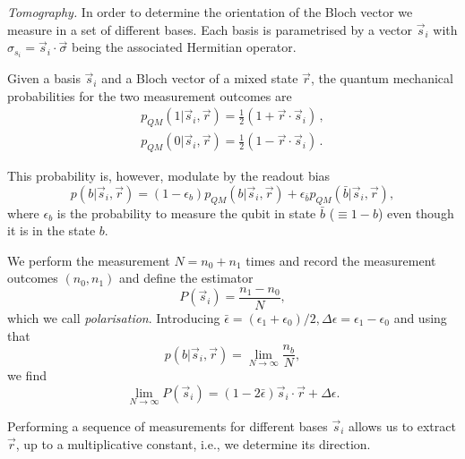 \documentclass[a4paper,twocolumn,11pt, accepted=2024-06-14]{quantumarticle}
\begin{document}
\emph{Tomography.} In order to determine the orientation of the Bloch vector we measure in a set of different bases. Each basis is parametrised by a vector $\vec{s}_i$ with $\sigma_{s_i} = \vec{s}_i \cdot \vec{\sigma}$ being the associated Hermitian operator.

Given a basis $\vec{s}_i$ and a Bloch vector of a mixed state $\vec{r}$, the quantum mechanical probabilities for the two measurement outcomes are
\begin{equation}\label{eqn:probs}
\begin{split}
p_{QM}(1|\vec{s}_i, \vec{r}) = \frac{1}{2}(1+\vec{r}\cdot\vec{s}_i)\,,\\
p_{QM}(0|\vec{s}_i, \vec{r}) = \frac{1}{2}(1-\vec{r}\cdot\vec{s}_i)\,.
\end{split}
\end{equation}

This probability is, however, modulate by the readout bias
\begin{equation}
    p(b|\vec{s}_i, \vec{r}) = (1-\epsilon_b)p_{QM}(b|\vec{s}_i, \vec{r}) + \epsilon_{\bar{b}} p_{QM}(\bar{b}|\vec{s}_i, \vec{r}), \label{eqn:marg}
\end{equation}
where $\epsilon_b$ is the probability to measure the qubit in state $\bar{b}$ ($\equiv 1-b$) even though it is in the state $b$.



We perform the measurement $N=n_0 + n_1$ times and record the measurement outcomes $(n_0, n_1)$ and define the estimator 
\begin{equation}
    P(\vec{s}_i) = \frac{n_1-n_0}{N},
\end{equation}
which we call \emph{polarisation}.
Introducing $\bar \epsilon = (\epsilon_1+\epsilon_0)/2, \Delta \epsilon = \epsilon_1-\epsilon_0$ and using that 
$$p(b|\vec{s}_i, \vec{r})=\lim_{N\to \infty} \frac{n_b}{N},$$
we find \begin{equation}
\lim_{N \to \infty} P(\vec{s}_i)=(1-2\bar\epsilon)\vec{s}_i \cdot \vec{r} + \Delta\epsilon.\label{eqn:estim}
\end{equation}
 
Performing a sequence of measurements for different bases $\vec{s}_i$ allows us to extract $\vec{r}$, up to a multiplicative constant, i.e., we determine its direction.
\end{document}
